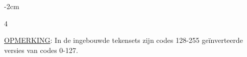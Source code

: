\begin{adjustwidth}{}{-2cm}
\begin{multicols}{4}
\begin{description}[align=left,labelwidth=0.2cm]
\end{description}
\end{multicols}
\end{adjustwidth}

\underline{OPMERKING}: In de ingebouwde tekensets zijn codes 128-255 geïnverteerde versies van codes 0-127.

